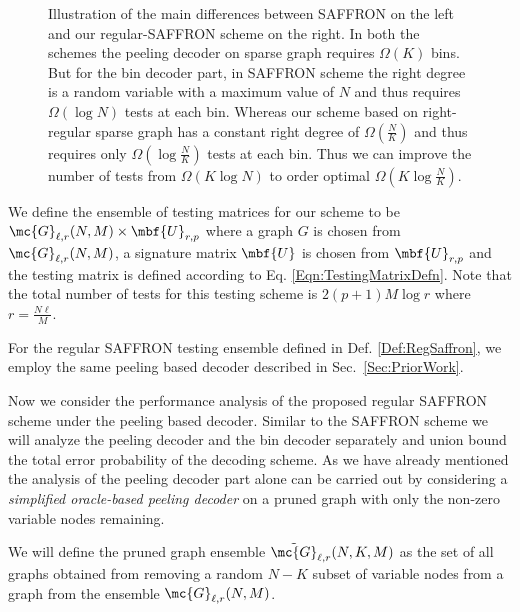 \documentclass[conference,,twocolumn]{IEEEtran}
\newcommand*{\FigPath}{./Figures}
\begin{document}
\begin{figure*}[t!]
\centering \scalebox{1}{}
\caption{Illustration of the main differences between SAFFRON \cite{lee2015saffron} on the left and our regular-SAFFRON scheme on the right. In both the schemes the peeling decoder on sparse graph requires $\Omega(K)$ bins. But for the bin decoder part, in SAFFRON scheme the right degree is a random variable with a maximum value of $N$ and thus requires $\Omega(\log N)$ tests at each bin. Whereas our scheme based on right-regular sparse graph has a constant right degree of $\Omega(\frac{N}{K})$ and thus requires only $\Omega(\log \frac{N}{K})$ tests at each bin. Thus we can improve the number of tests from $\Omega (K\log N)$ to order optimal $\Omega(K\log \frac{N}{K})$.}
\end{figure*}

\begin{definition}
\label{Def:RegSaffron}
We define the ensemble of testing matrices for our scheme to be $\mc{G}_{\ell,r}(N,M)\times \mbf{U}_{r,p}$ where a graph $G$ is chosen from $\mc{G}_{\ell,r}(N,M)$, a signature matrix $\mbf{U}$ is chosen from $\mbf{U}_{r,p}$ and the testing matrix is defined according to Eq. \eqref{Eqn:TestingMatrixDefn}. Note that the total number of tests for this testing scheme is $2(p+1)M\log r$ where $r=\frac{N\ell}{M}$.
\end{definition}

For the regular SAFFRON testing ensemble defined in Def. \ref{Def:RegSaffron}, we employ the same peeling based decoder described in Sec.~\ref{Sec:PriorWork}. 

Now we consider the performance analysis of the proposed regular SAFFRON scheme under the peeling based decoder. Similar to the SAFFRON scheme we will analyze the peeling decoder and the bin decoder separately and union bound the total error probability of the decoding scheme. As we have already mentioned the analysis of the peeling decoder part alone can be carried out by considering a \textit{simplified oracle-based peeling decoder} on a pruned graph with only the non-zero variable nodes remaining. 

\begin{definition}
We will define the pruned graph ensemble $\tilde{\mc{G}}_{\ell,r}(N,K,M)$ as the set of all graphs obtained from removing a random $N-K$ subset of variable nodes from a graph from the ensemble $\mc{G}_{\ell,r}(N,M)$.
\end{definition}
\end{document}
